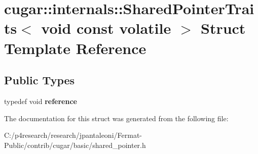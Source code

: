 \hypertarget{structcugar_1_1internals_1_1_shared_pointer_traits_3_01void_01const_01volatile_01_4}{}\section{cugar\+:\+:internals\+:\+:Shared\+Pointer\+Traits$<$ void const volatile $>$ Struct Template Reference}
\label{structcugar_1_1internals_1_1_shared_pointer_traits_3_01void_01const_01volatile_01_4}
\subsection*{Public Types}
\begin{DoxyCompactItemize}
\item 
\mbox{\label{structcugar_1_1internals_1_1_shared_pointer_traits_3_01void_01const_01volatile_01_4_aacc7e529f17da49dbe737da73ea54255}} 
typedef void {\bfseries reference}
\end{DoxyCompactItemize}


The documentation for this struct was generated from the following file\+:\begin{DoxyCompactItemize}
\item 
C\+:/p4research/research/jpantaleoni/\+Fermat-\/\+Public/contrib/cugar/basic/shared\+\_\+pointer.\+h\end{DoxyCompactItemize}
